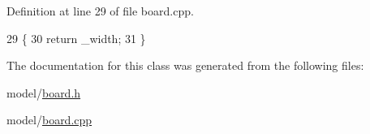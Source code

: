 Definition at line 29 of file board.\+cpp.


\begin{DoxyCode}
29                    \{
30     \textcolor{keywordflow}{return} \_width;
31 \}
\end{DoxyCode}


The documentation for this class was generated from the following files\+:\begin{DoxyCompactItemize}
\item 
model/\hyperlink{board_8h}{board.\+h}\item 
model/\hyperlink{board_8cpp}{board.\+cpp}\end{DoxyCompactItemize}
